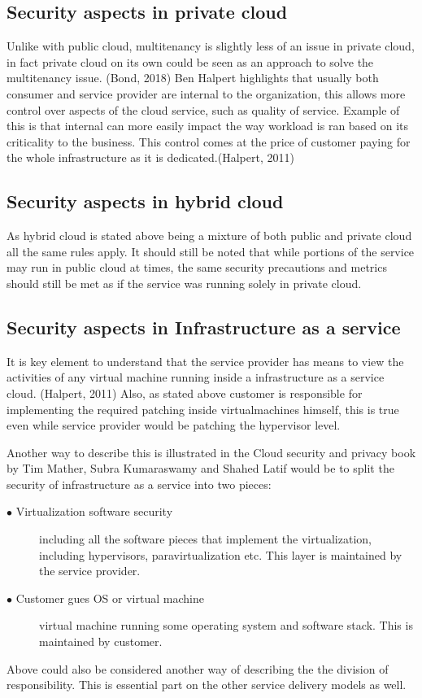 \documentclass{article}
\begin{document}
\subsection{Security aspects in private cloud}
Unlike with public cloud, multitenancy is slightly less of an issue in private cloud, in fact private cloud on its own could be seen as an approach to solve the multitenancy issue. (Bond, 2018)
Ben Halpert highlights that usually both consumer and service provider are internal to the organization, this allows more control over aspects of the cloud service, such as quality of service.
Example of this is that internal can more easily impact the way workload is ran based on its criticality to the business. This control comes at the price of customer paying for the whole infrastructure as it is dedicated.(Halpert, 2011) 
\subsection{Security aspects in hybrid cloud}
As hybrid cloud is stated above being a mixture of both public and private cloud all the same rules apply. It should still be noted that while portions of the service may run in public cloud at times, the same security precautions and metrics should still be met as if the service was running solely in private cloud.
\subsection{Security aspects in Infrastructure as a service}
It is key element to understand that the service provider has means to view the activities of any virtual machine running inside a infrastructure as a service cloud. (Halpert, 2011)
Also, as stated above customer is responsible for implementing the required patching inside virtualmachines himself, this is true even while service provider would be patching the hypervisor level.
\par
Another way to describe this is illustrated in the Cloud security and privacy book by Tim Mather, Subra Kumaraswamy and Shahed Latif would be to split the security of infrastructure as a service into two pieces:
\begin{description}
	\item[$\bullet$ Virtualization software security] including all the software pieces that implement the virtualization, including hypervisors, paravirtualization etc. This layer is maintained by the service provider.
	\item[$\bullet$ Customer gues OS or virtual machine] virtual machine running some operating system and software stack. This is maintained by customer.
\end{description}
Above could also be considered another way of describing the the division of responsibility. This is essential part on the other service delivery models as well.
\end{document}
